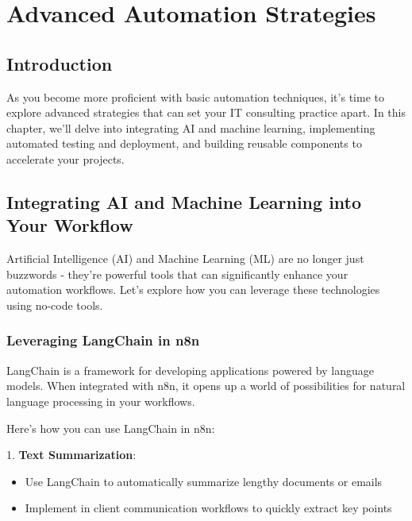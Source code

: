 \chapter{Advanced Automation Strategies}

\section{Introduction}

As you become more proficient with basic automation techniques, it's time to explore advanced strategies that can set your IT consulting practice apart. In this chapter, we'll delve into integrating AI and machine learning, implementing automated testing and deployment, and building reusable components to accelerate your projects.

\section{Integrating AI and Machine Learning into Your Workflow}

Artificial Intelligence (AI) and Machine Learning (ML) are no longer just buzzwords - they're powerful tools that can significantly enhance your automation workflows. Let's explore how you can leverage these technologies using no-code tools.

\subsection{Leveraging LangChain in n8n}

LangChain is a framework for developing applications powered by language models. When integrated with n8n, it opens up a world of possibilities for natural language processing in your workflows.

Here's how you can use LangChain in n8n:

1. \textbf{Text Summarization}:
\begin{itemize}
    \item Use LangChain to automatically summarize lengthy documents or emails
    \item Implement in client communication workflows to quickly extract key points
\end{itemize}



